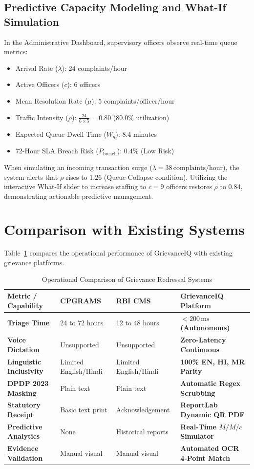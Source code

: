 \subsection{Predictive Capacity Modeling and What-If Simulation}
In the Administrative Dashboard, supervisory officers observe real-time queue metrics:
\begin{itemize}
    \item Arrival Rate ($\lambda$): 24 complaints/hour
    \item Active Officers ($c$): 6 officers
    \item Mean Resolution Rate ($\mu$): 5 complaints/officer/hour
    \item Traffic Intensity ($\rho$): $\frac{24}{6 \times 5} = 0.80$ ($80.0\%$ utilization)
    \item Expected Queue Dwell Time ($W_q$): 8.4 minutes
    \item 72-Hour SLA Breach Risk ($P_{\text{breach}}$): $0.4\%$ (Low Risk)
\end{itemize}
When simulating an incoming transaction surge ($\lambda = 38\,\text{complaints/hour}$), the system alerts that $\rho$ rises to $1.26$ (Queue Collapse condition). Utilizing the interactive What-If slider to increase staffing to $c = 9$ officers restores $\rho$ to $0.84$, demonstrating actionable predictive management.

\section{Comparison with Existing Systems}
Table~\ref{tab:results_comparison} compares the operational performance of GrievanceIQ with existing grievance platforms.

\begin{table}[h]
\centering
\caption{Operational Comparison of Grievance Redressal Systems}
\label{tab:results_comparison}
\begin{tabular}{|p{3.5cm}|p{2.8cm}|p{2.8cm}|p{3.8cm}|}
\hline
\textbf{Metric / Capability} & \textbf{CPGRAMS} & \textbf{RBI CMS} & \textbf{GrievanceIQ Platform} \\ \hline
\textbf{Triage Time} & 24 to 72 hours & 12 to 48 hours & \textbf{$< 200\,\text{ms}$ (Autonomous)} \\ \hline
\textbf{Voice Dictation} & Unsupported & Unsupported & \textbf{Zero-Latency Continuous} \\ \hline
\textbf{Linguistic Inclusivity} & Limited English/Hindi & Limited English/Hindi & \textbf{100\% EN, HI, MR Parity} \\ \hline
\textbf{DPDP 2023 Masking} & Plain text & Plain text & \textbf{Automatic Regex Scrubbing} \\ \hline
\textbf{Statutory Receipt} & Basic text print & Acknowledgement & \textbf{ReportLab Dynamic QR PDF} \\ \hline
\textbf{Predictive Analytics} & None & Historical reports & \textbf{Real-Time $M/M/c$ Simulator} \\ \hline
\textbf{Evidence Validation} & Manual visual & Manual visual & \textbf{Automated OCR 4-Point Match} \\ \hline
\end{tabular}
\end{table}

